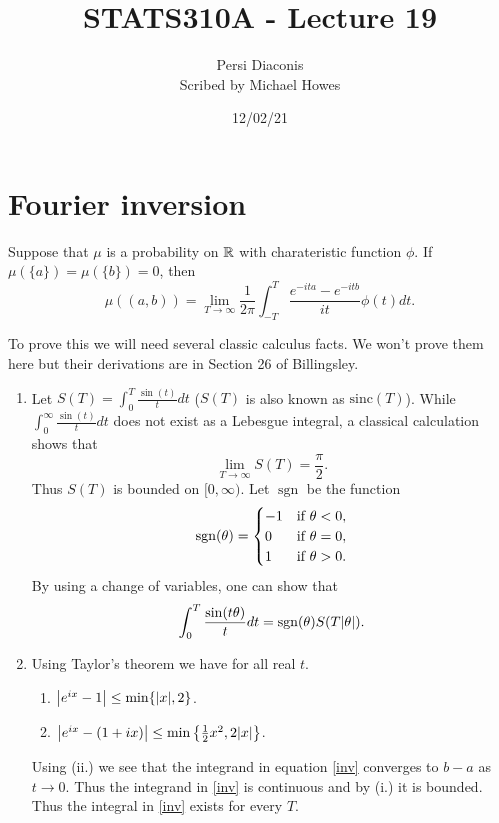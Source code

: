 

\DeclareMathOperator*{\sgn}{sgn}


\title{STATS310A - Lecture 19}
\author{Persi Diaconis\\ Scribed by Michael Howes}
\date{12/02/21}

\pagestyle{fancy}
\fancyhf{}


\maketitle
\tableofcontents
\section{Fourier inversion}
\begin{thrm}
    Suppose that $\mu$ is a probability on ${\mathbb R}$ with charateristic function $\phi$. If $\mu(\{a\})=\mu(\{b\})=0$, then 
    \begin{equation}\label{inv}\mu((a,b)) = \lim_{T \to \infty} \frac{1}{2\pi}\int_{-T}^T \frac{e^{-ita}-e^{-itb}}{it}\phi(t)dt.
    \end{equation}
\end{thrm}
To prove this we will need several classic calculus facts. We won't prove them here but their derivations are in Section 26 of Billingsley. 
\begin{enumerate}
    \item Let $S(T) = \int_0^T \frac{\sin(t)}{t}dt$ ($S(T)$ is also known as $\text{sinc}(T)$). While $\int_0^\infty \frac{\sin(t)}{t}dt$ does not exist as a Lebesgue integral, a classical calculation shows that 
    \[\lim_{T \to \infty} S(T)=\frac{\pi}{2}.  \]
    Thus $S(T)$ is bounded on $[0,\infty)$. Let $\sgn$ be the function 
    \[\sgn(\ta) =\begin{cases}
        -1 & \text{if } \ta < 0,\\
        0 & \text{if } \ta=0,\\
        1 & \text{if } \ta > 0.
    \end{cases} \]
    By using a change of variables, one can show that 
    \begin{equation}\label{sinc}\int_0^T \frac{\sin(t\ta)}{t}dt = \sgn(\ta)S(T\abs{\ta}).\end{equation}
    \item Using Taylor's theorem we have for all real $t$.
    \begin{enumerate}
        \item ${\left\lvert e^{ix}-1\right\rvert}\le\min\{{\left\lvert x\right\rvert},2\}$.
        \item ${\left\lvert e^{ix}-(1+ix)\right\rvert}\le \min\left\{\frac{1}{2}x^2,2{\left\lvert x\right\rvert}\right\}$.
    \end{enumerate}
    Using (ii.) we see that the integrand in equation \eqref{inv} converges to $b-a$ as $t \to 0$. Thus the integrand in \eqref{inv} is continuous and by (i.) it is bounded. Thus the integral in \eqref{inv} exists for every $T$.
\end{enumerate}
